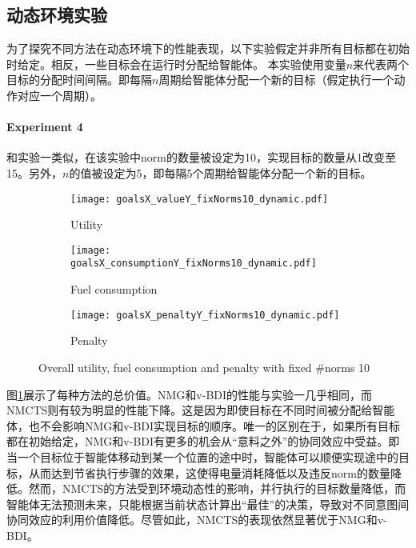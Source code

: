 \subsection{动态环境实验}
为了探究不同方法在动态环境下的性能表现，以下实验假定并非所有目标都在初始时给定。相反，一些目标会在运行时分配给智能体。
%
本实验使用变量$n$来代表两个目标的分配时间间隔。即每隔$n$周期给智能体分配一个新的目标（假定执行一个动作对应一个周期）。

\paragraph{Experiment 4}
和实验一类似，在该实验中norm的数量被设定为10，实现目标的数量从1改变至15。另外，$n$的值被设定为5，即每隔5个周期给智能体分配一个新的目标。
\begin{figure}
\centering
\begin{subfigure}{.47\textwidth}
  \centering
  \texttt{[image: goalsX\_valueY\_fixNorms10\_dynamic.pdf]}
  \captionsetup{justification=centering}
  \caption{Utility}
  \label{fig:goalsX_valueY_fixNorms10_dynamic}
\end{subfigure}

\begin{subfigure}{.47\textwidth}
  \centering
  \texttt{[image: goalsX\_consumptionY\_fixNorms10\_dynamic.pdf]}
  \captionsetup{justification=centering}
  \caption{Fuel consumption}
  \label{fig:goalsX_consumptionY_fixNorms10_dynamic}
\end{subfigure}
\begin{subfigure}{.47\textwidth}
  \centering
  \texttt{[image: goalsX\_penaltyY\_fixNorms10\_dynamic.pdf]}
  \captionsetup{justification=centering}
  \caption{Penalty}
  \label{fig:goalsX_penaltyY_fixNorms10_dynamic}
\end{subfigure}
\captionsetup{justification=centering}
\caption{Overall utility, fuel consumption and penalty with fixed \#norms 10}
\label{fig:all_fixNorms10_dynamic}
\end{figure}

图\ref{fig:goalsX_valueY_fixNorms10_dynamic}展示了每种方法的总价值。NMG和v-BDI的性能与实验一几乎相同，而NMCTS则有较为明显的性能下降。这是因为即使目标在不同时间被分配给智能体，也不会影响NMG和v-BDI实现目标的顺序。唯一的区别在于，如果所有目标都在初始给定，NMG和v-BDI有更多的机会从“意料之外”的协同效应中受益。即当一个目标位于智能体移动到某一个位置的途中时，智能体可以顺便实现途中的目标，从而达到节省执行步骤的效果，这使得电量消耗降低以及违反norm的数量降低。然而，NMCTS的方法受到环境动态性的影响，并行执行的目标数量降低，而智能体无法预测未来，只能根据当前状态计算出“最佳”的决策，导致对不同意图间协同效应的利用价值降低。尽管如此，NMCTS的表现依然显著优于NMG和v-BDI。


